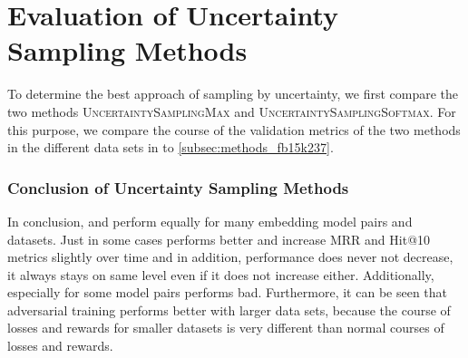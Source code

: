 \section{Evaluation of Uncertainty Sampling Methods}
\label{ch:evaluation:sec:evaluation_methods}

To determine the best approach of sampling by uncertainty, we first compare the two methods \textsc{UncertaintySamplingMax} and \textsc{UncertaintySamplingSoftmax}.
For this purpose, we compare the course of the validation metrics of the two methods in the different data sets in  to \ref{subsec:methods_fb15k237}.









\subsubsection{Conclusion of Uncertainty Sampling Methods}

In conclusion, \usmax and \ussoftmax perform equally for many embedding model pairs and datasets.
Just in some cases \ussoftmax performs better and increase MRR and Hit@10 metrics slightly over time and in addition, performance does never not decrease, it always stays on same level even if it does not increase either.
Additionally, especially for some model pairs \usmax performs bad.
Furthermore, it can be seen that adversarial training performs better with larger data sets, because the course of losses and rewards for smaller datasets is very different than normal courses of losses and rewards.

